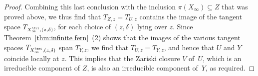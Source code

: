 \begin{proof}
Combining this last conclusion with the inclusion
$\pi(X_{\infty}) \subseteq Z$ that was proved above,
we thus find that $T_{Z,z} = T_{U,z}$ contains
the image of the tangent space $T_{X^{\tri}_{\infty},(z,\delta)}$,
for each
choice of $(z,\delta)$ lying over $z$.
Since Theorem~\ref{thm:infinite fern}~(2) shows that
the images of the various tangent spaces $T_{X^{\tri}_{\infty},(z,\delta)}$
span $T_{Y,z}$,
we find that $T_{U,z} = T_{Y,z}$, and hence that $U$ and $Y$ coincide
locally at $z$. This implies that the Zariski closure
$V$ of~$U$, which is an irreducible component of $Z$, is also
an irreducible component of~$Y$, as required.
\end{proof}

\vspace*{-1\baselineskip}\enlargethispage{.5\baselineskip}%
